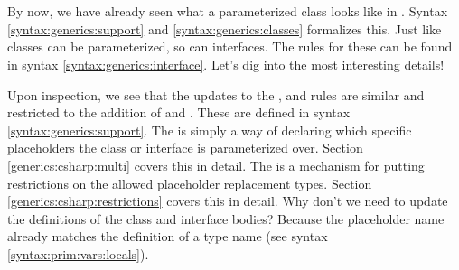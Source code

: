 \section{\csharp}

By now, we have already seen what a parameterized class looks like in \csharp. Syntax \ref{syntax:generics:support} and \ref{syntax:generics:classes} formalizes this. Just like classes can be parameterized, so can interfaces. The rules for these can be found in syntax \ref{syntax:generics:interface}. Let's dig into the most interesting details!

\begin{syntaxfloat}
  
  \caption{Support definitions for parameterized types}
  \label{syntax:generics:support}
\end{syntaxfloat}

\begin{syntaxfloat}
  
  \caption{Class definitions as parameterized types}
  \label{syntax:generics:classes}
\end{syntaxfloat}

\begin{syntaxfloat}
  
  \caption{Interface definitions as parameterized types}
  \label{syntax:generics:interface}
\end{syntaxfloat}

Upon inspection, we see that the updates to the ,  and  rules are similar and restricted to the addition of  and . These are defined in syntax \ref{syntax:generics:support}. The  is simply a way of declaring which specific placeholders the class or interface is parameterized over. Section \ref{generics:csharp:multi} covers this in detail. The  is a mechanism for putting restrictions on the allowed placeholder replacement types. Section \ref{generics:csharp:restrictions} covers this in detail. Why don't we need to update the definitions of the class and interface bodies? Because the placeholder name already matches the definition of a type name (see syntax \ref{syntax:prim:vars:locals}).


